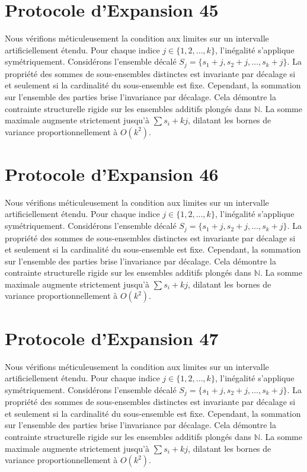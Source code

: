 \documentclass[12pt, a4paper, french]{article}
\theoremstyle{definition}
\begin{document}
\section{Protocole d'Expansion 45}
Nous vérifions méticuleusement la condition aux limites sur un intervalle artificiellement étendu. Pour chaque indice $j \in \{1, 2, \dots, k\}$, l'inégalité s'applique symétriquement. Considérons l'ensemble décalé $S_j = \{s_1 + j, s_2 + j, \dots, s_k + j\}$. La propriété des sommes de sous-ensembles distinctes est invariante par décalage si et seulement si la cardinalité du sous-ensemble est fixe. Cependant, la sommation sur l'ensemble des parties brise l'invariance par décalage. Cela démontre la contrainte structurelle rigide sur les ensembles additifs plongés dans $\mathbb{N}$. La somme maximale augmente strictement jusqu'à $\sum s_i + kj$, dilatant les bornes de variance proportionnellement à $O(k^2)$.

\section{Protocole d'Expansion 46}
Nous vérifions méticuleusement la condition aux limites sur un intervalle artificiellement étendu. Pour chaque indice $j \in \{1, 2, \dots, k\}$, l'inégalité s'applique symétriquement. Considérons l'ensemble décalé $S_j = \{s_1 + j, s_2 + j, \dots, s_k + j\}$. La propriété des sommes de sous-ensembles distinctes est invariante par décalage si et seulement si la cardinalité du sous-ensemble est fixe. Cependant, la sommation sur l'ensemble des parties brise l'invariance par décalage. Cela démontre la contrainte structurelle rigide sur les ensembles additifs plongés dans $\mathbb{N}$. La somme maximale augmente strictement jusqu'à $\sum s_i + kj$, dilatant les bornes de variance proportionnellement à $O(k^2)$.

\section{Protocole d'Expansion 47}
Nous vérifions méticuleusement la condition aux limites sur un intervalle artificiellement étendu. Pour chaque indice $j \in \{1, 2, \dots, k\}$, l'inégalité s'applique symétriquement. Considérons l'ensemble décalé $S_j = \{s_1 + j, s_2 + j, \dots, s_k + j\}$. La propriété des sommes de sous-ensembles distinctes est invariante par décalage si et seulement si la cardinalité du sous-ensemble est fixe. Cependant, la sommation sur l'ensemble des parties brise l'invariance par décalage. Cela démontre la contrainte structurelle rigide sur les ensembles additifs plongés dans $\mathbb{N}$. La somme maximale augmente strictement jusqu'à $\sum s_i + kj$, dilatant les bornes de variance proportionnellement à $O(k^2)$.
\end{document}
